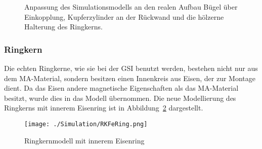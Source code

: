             \begin{figure}[htb]
                \centering
                \hspace{0.01\textwidth}
                \hspace{0.01\textwidth}
                \caption{Anpassung des Simulationsmodells an den realen Aufbau \protect{} Bügel über Einkopplung, \protect{} Kupferzylinder an der Rückwand und \protect{} die hölzerne Halterung des Ringkerns.}
                \label{fig:AnpassungCST}
            \end{figure}
        
            \subsubsection{Ringkern}
            \label{sec:ringkern}
            Die echten Ringkerne, wie sie bei der GSI benutzt werden, bestehen nicht nur aus dem MA-Material, sondern besitzen einen Innenkreis aus Eisen, der zur Montage dient. Da das Eisen andere magnetische Eigenschaften als das MA-Material besitzt, wurde dies in das Modell übernommen. Die neue Modellierung des Ringkerns mit innerem Eisenring ist in Abbildung~\ref{fig:RKFeRingCST} dargestellt.
                
                \begin{figure}[htb]
                    \centering
                    \texttt{[image: ./Simulation/RKFeRing.png]}
                    \caption{Ringkernmodell mit innerem Eisenring}
                    \label{fig:RKFeRingCST}
                \end{figure}
            
